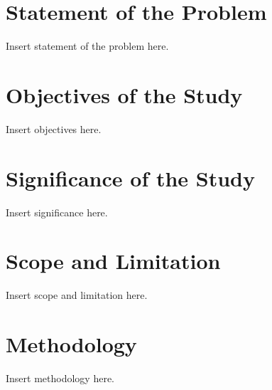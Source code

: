\section{Statement of the Problem}

Insert statement of the problem here.

\section{Objectives of the Study}

Insert objectives here.

\section{Significance of the Study}

Insert significance here.

\section{Scope and Limitation}

Insert scope and limitation here.

\section{Methodology}

Insert methodology here.